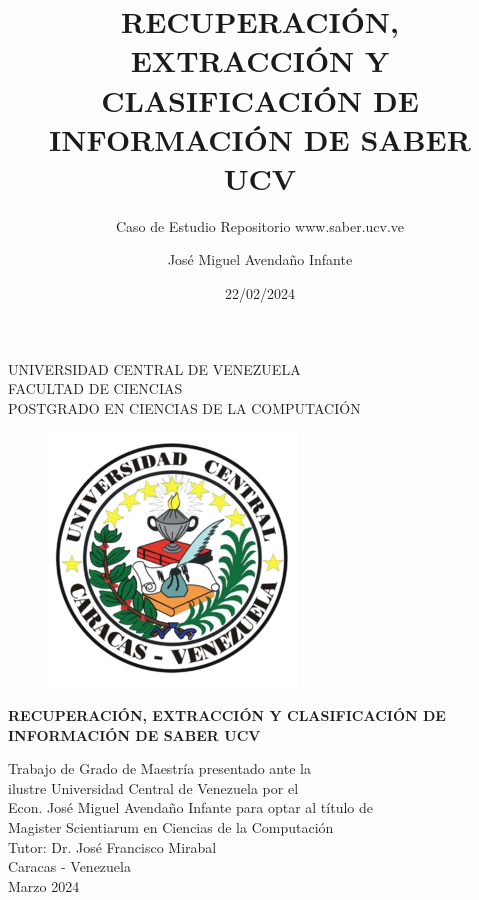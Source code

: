 \documentclass[
  12pt,
  openany]{book}
\title{RECUPERACIÓN, EXTRACCIÓN Y CLASIFICACIÓN DE INFORMACIÓN DE SABER UCV}
\subtitle{Caso de Estudio Repositorio www.saber.ucv.ve}
\author{José Miguel Avendaño Infante}
\date{22/02/2024}
\begin{document}
\maketitle

\thispagestyle{empty}
\begin{center}
	UNIVERSIDAD CENTRAL DE VENEZUELA\\
	FACULTAD DE CIENCIAS\\
	POSTGRADO EN CIENCIAS DE LA COMPUTACI\'ON\\

	\begin{figure}
						\centering
						  \includegraphics[height=.7\textwidth]{images/UCV.png}
  \end{figure}
  \vspace{1.5cm}
  \large{\textbf{RECUPERACI\'ON, EXTRACCI\'ON Y CLASIFICACI\'ON DE \\ INFORMACI\'ON DE SABER UCV}}

  \vspace{3cm}
  Trabajo de Grado de Maestría presentado ante la \\
  ilustre Universidad Central de Venezuela por el\\
  Econ. José Miguel Avendaño Infante para  optar
  al título de \\Magister Scientiarum en Ciencias de la Computaci\'on\\
  \vspace{0.5cm}
  Tutor: Dr. José Francisco Mirabal\\
  \vspace{1.5cm}
  Caracas - Venezuela\\
  Marzo 2024
\end{center}
\end{document}
